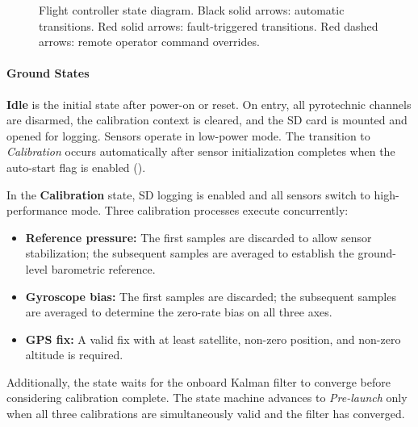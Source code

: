 \begin{figure}[H]
{%
}
\caption{Flight controller state diagram. Black solid arrows: automatic transitions. Red solid arrows: fault-triggered transitions. Red dashed arrows: remote operator command overrides.}
\label{fig:state_machine}
\end{figure}

\paragraph{Ground States}

\textbf{Idle} is the initial state after power-on or reset. On entry, all pyrotechnic channels are disarmed, the calibration context is cleared, and the SD card is mounted and opened for logging. Sensors operate in low-power mode. The transition to \emph{Calibration} occurs automatically after sensor initialization completes when the auto-start flag is enabled ().

In the \textbf{Calibration} state, SD logging is enabled and all sensors switch to high-performance mode. Three calibration processes execute concurrently:
\begin{itemize}
    \item \textbf{Reference pressure:} The first  samples are discarded to allow sensor stabilization; the subsequent  samples are averaged to establish the ground-level barometric reference.
    \item \textbf{Gyroscope bias:} The first  samples are discarded; the subsequent  samples are averaged to determine the zero-rate bias on all three axes.
    \item \textbf{GPS fix:} A valid fix with at least  satellite, non-zero position, and non-zero altitude is required.
\end{itemize}
Additionally, the state waits for the onboard Kalman filter to converge before considering calibration complete. The state machine advances to \emph{Pre-launch} only when all three calibrations are simultaneously valid and the filter has converged.

